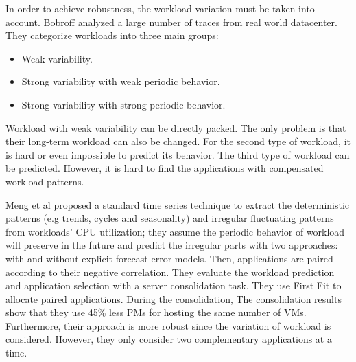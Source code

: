 In order to achieve robustness, the workload variation must be taken into account. Bobroff \cite{Bobroff:2007ec} analyzed a large number of traces from real world datacenter. They categorize workloads into three main groups: 

\begin{itemize}
	\item Weak variability.
	\item Strong variability with weak periodic behavior.
	\item Strong variability with strong periodic behavior.
\end{itemize}
Workload with weak variability can be directly packed. The only problem is that their long-term workload can also be changed. 
For the second type of workload, it is hard or even impossible to predict its behavior. The third type of workload can be predicted. However, it is hard to find the applications with compensated workload patterns. 

Meng et al \cite{Meng:2010gh} proposed a standard time series technique to extract the deterministic patterns (e.g trends, cycles and seasonality) and irregular fluctuating patterns from workloads' CPU utilization; they assume the periodic behavior of workload will preserve in the future and predict the irregular parts with two approaches: with and without explicit forecast error models. Then, applications are paired according to their negative correlation. They evaluate the workload prediction and application selection with a server consolidation task. They use First Fit to allocate paired applications. During the consolidation, The consolidation results show that they use 45\% less PMs for hosting the same number of VMs. Furthermore, their approach is more robust since the variation of workload is considered. However, they only consider two complementary applications at a time. 


